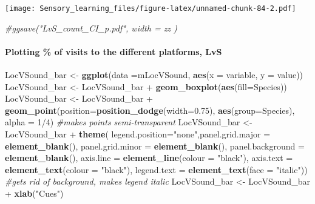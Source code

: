 \documentclass[]{article}
\newenvironment{Shaded}{\begin{snugshade}}{\end{snugshade}}
\newcommand{\KeywordTok}[1]{\textcolor[rgb]{0.13,0.29,0.53}{\textbf{{#1}}}}
\newcommand{\DataTypeTok}[1]{\textcolor[rgb]{0.13,0.29,0.53}{{#1}}}
\newcommand{\DecValTok}[1]{\textcolor[rgb]{0.00,0.00,0.81}{{#1}}}
\newcommand{\FloatTok}[1]{\textcolor[rgb]{0.00,0.00,0.81}{{#1}}}
\newcommand{\StringTok}[1]{\textcolor[rgb]{0.31,0.60,0.02}{{#1}}}
\newcommand{\CommentTok}[1]{\textcolor[rgb]{0.56,0.35,0.01}{\textit{{#1}}}}
\newcommand{\NormalTok}[1]{{#1}}
\let\oldparagraph\paragraph
\renewcommand{\paragraph}[1]{\oldparagraph{#1}\mbox{}}
\begin{document}
\texttt{[image: Sensory\_learning\_files/figure-latex/unnamed-chunk-84-2.pdf]}

\begin{Shaded}
\begin{Highlighting}[]
\CommentTok{#ggsave("LvS_count_CI_p.pdf", width = zz  )}
\end{Highlighting}
\end{Shaded}

\paragraph{Plotting \% of visits to the different platforms,
LvS}\label{plotting-of-visits-to-the-different-platforms-lvs-2}

\begin{Shaded}
\begin{Highlighting}[]
\NormalTok{LocVSound_bar <-}\StringTok{ }\KeywordTok{ggplot}\NormalTok{(}\DataTypeTok{data =}\NormalTok{mLocVSound, }\KeywordTok{aes}\NormalTok{(}\DataTypeTok{x =} \NormalTok{variable, }\DataTypeTok{y =} \NormalTok{value))}
\NormalTok{LocVSound_bar <-}\StringTok{ }\NormalTok{LocVSound_bar +}\StringTok{ }\KeywordTok{geom_boxplot}\NormalTok{(}\KeywordTok{aes}\NormalTok{(}\DataTypeTok{fill=}\NormalTok{Species))}
\NormalTok{LocVSound_bar <-}\StringTok{ }\NormalTok{LocVSound_bar +}\StringTok{ }\KeywordTok{geom_point}\NormalTok{(}\DataTypeTok{position=}\KeywordTok{position_dodge}\NormalTok{(}\DataTypeTok{width=}\FloatTok{0.75}\NormalTok{), }\KeywordTok{aes}\NormalTok{(}\DataTypeTok{group=}\NormalTok{Species), }\DataTypeTok{alpha =} \DecValTok{1}\NormalTok{/}\DecValTok{4}\NormalTok{) }\CommentTok{#makes points semi-transparent}
\NormalTok{LocVSound_bar <-}\StringTok{ }\NormalTok{LocVSound_bar +}\StringTok{  }\KeywordTok{theme}\NormalTok{( }\DataTypeTok{legend.position=}\StringTok{"none"}\NormalTok{,}\DataTypeTok{panel.grid.major =} \KeywordTok{element_blank}\NormalTok{(), }\DataTypeTok{panel.grid.minor =} \KeywordTok{element_blank}\NormalTok{(),}
\DataTypeTok{panel.background =} \KeywordTok{element_blank}\NormalTok{(), }\DataTypeTok{axis.line =} \KeywordTok{element_line}\NormalTok{(}\DataTypeTok{colour =} \StringTok{"black"}\NormalTok{), }\DataTypeTok{axis.text =} \KeywordTok{element_text}\NormalTok{(}\DataTypeTok{colour =} \StringTok{"black"}\NormalTok{), }\DataTypeTok{legend.text =} \KeywordTok{element_text}\NormalTok{(}\DataTypeTok{face =} \StringTok{"italic"}\NormalTok{))  }\CommentTok{#gets rid of background, makes legend italic}
\NormalTok{LocVSound_bar <-}\StringTok{ }\NormalTok{LocVSound_bar +}\StringTok{ }\KeywordTok{xlab}\NormalTok{(}\StringTok{"Cues"}\NormalTok{)}

\end{Highlighting}
\end{Shaded}
\end{document}
